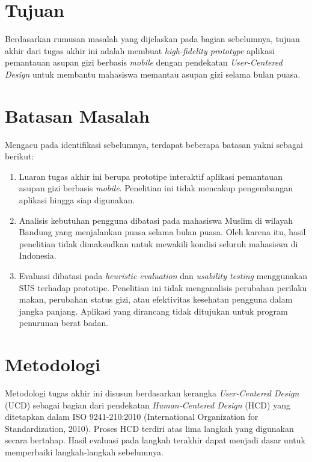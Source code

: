 \section{Tujuan}
Berdasarkan rumusan masalah yang dijelaskan pada bagian sebelumnya, tujuan akhir dari tugas akhir ini adalah membuat \textit{high-fidelity prototype} aplikasi pemantauan asupan gizi berbasis \textit{mobile} dengan pendekatan \textit{User-Centered Design} untuk membantu mahasiswa memantau asupan gizi selama bulan puasa.
\section{Batasan Masalah}
Mengacu pada identifikasi sebelumnya, terdapat beberapa batasan yakni sebagai berikut:
\begin{enumerate}
    \item Luaran tugas akhir ini berupa prototipe interaktif aplikasi pemantauan asupan gizi berbasis \textit{mobile}. Penelitian ini tidak mencakup pengembangan aplikasi hingga siap digunakan.
    \item Analisis kebutuhan pengguna dibatasi pada mahasiswa Muslim di wilayah Bandung yang menjalankan puasa selama bulan puasa. Oleh karena itu, hasil penelitian tidak dimaksudkan untuk mewakili kondisi seluruh mahasiswa di Indonesia.
    \item Evaluasi dibatasi pada \textit{heuristic evaluation} dan \textit{usability testing} menggunakan SUS terhadap prototipe. Penelitian ini tidak menganalisis perubahan perilaku makan, perubahan status gizi, atau efektivitas kesehatan pengguna dalam jangka panjang. Aplikasi yang dirancang tidak ditujukan untuk program penurunan berat badan.
\end{enumerate}

\section{Metodologi}

Metodologi tugas akhir ini disusun berdasarkan kerangka \textit{User-Centered Design} (UCD) sebagai bagian dari pendekatan \textit{Human-Centered Design} (HCD) yang ditetapkan dalam ISO 9241-210:2010 (International Organization for Standardization, 2010). Proses HCD terdiri atas lima langkah yang digunakan secara bertahap. Hasil evaluasi pada langkah terakhir dapat menjadi dasar untuk memperbaiki langkah-langkah sebelumnya.

